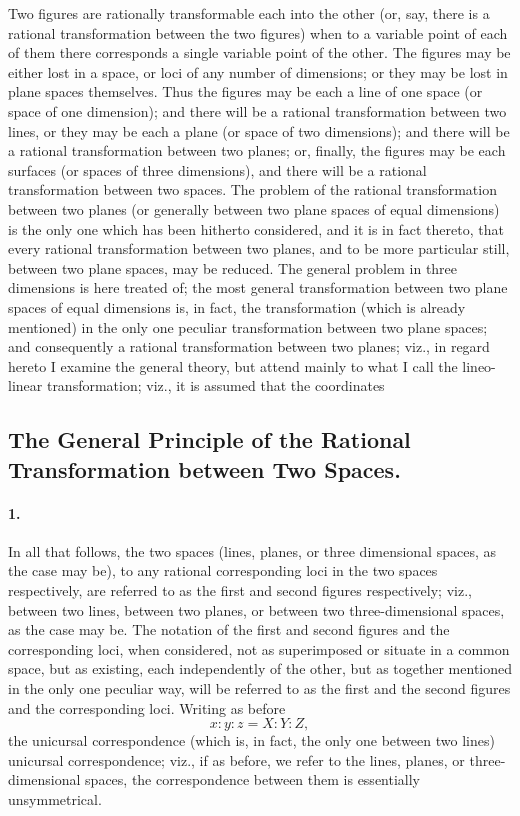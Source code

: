 \documentclass[11pt,a4paper]{article}
\begin{document}
Two figures are rationally transformable each into the other (or, say, there is a
rational transformation between the two figures) when to a variable point of each of
them there corresponds a single variable point of the other. The figures may be
either lost in a space, or loci of any number of dimensions; or they may be lost in
plane spaces themselves. Thus the figures may be each a line of one space (or space
of one dimension); and there will be a rational transformation between two lines, or
they may be each a plane (or space of two dimensions); and there will be a rational
transformation between two planes; or, finally, the figures may be each surfaces (or
spaces of three dimensions), and there will be a rational transformation between two
spaces. The problem of the rational transformation between two planes (or generally
between two plane spaces of equal dimensions) is the only one which has been hitherto
considered, and it is in fact thereto, that every rational transformation between
two planes, and to be more particular still, between two plane spaces, may be reduced.
The general problem in three dimensions is here treated of; the most general
transformation between two plane spaces of equal dimensions is, in fact, the
transformation (which is already mentioned) in the only one peculiar transformation
between two plane spaces; and consequently a rational transformation between two
planes; viz., in regard hereto I examine the general theory, but attend mainly to
what I call the lineo-linear transformation; viz., it is assumed that the coordinates

\bigskip

\subsection*{The General Principle of the Rational Transformation between Two Spaces.}

\paragraph{1.}
In all that follows, the two spaces (lines, planes, or three dimensional spaces, as
the case may be), to any rational corresponding loci in the two spaces respectively,
are referred to as the first and second figures respectively; viz., between two
lines, between two planes, or between two three-dimensional spaces, as the case may
be. The notation of the first and second figures and the corresponding loci, when
considered, not as superimposed or situate in a common space, but as existing, each
independently of the other, but as together mentioned in the only one peculiar way,
will be referred to as the first and the second figures and the corresponding loci.
Writing as before
\[
x:y:z = X : Y : Z,
\]
the unicursal correspondence (which is, in fact, the only one between two lines)
unicursal correspondence; viz., if as before, we refer to the lines, planes, or
three-dimensional spaces, the correspondence between them is essentially unsymmetrical.
\end{document}
